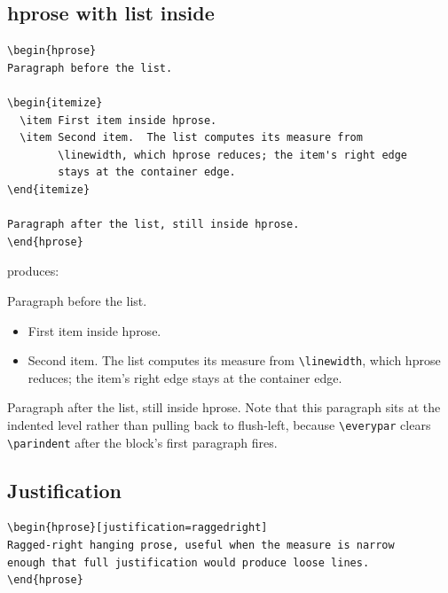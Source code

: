 \documentclass[11pt, twoside, openany]{article}
\newcommand{\cs}[1]{\texttt{\textbackslash #1}}
\begin{document}
\subsection*{hprose with list inside}

\begin{verbatim}
\begin{hprose}
Paragraph before the list.

\begin{itemize}
  \item First item inside hprose.
  \item Second item.  The list computes its measure from
        \linewidth, which hprose reduces; the item's right edge
        stays at the container edge.
\end{itemize}

Paragraph after the list, still inside hprose.
\end{hprose}
\end{verbatim}

\noindent produces:

\begin{hprose}
Paragraph before the list. \lipsum[10][1-3]

\begin{itemize}
  \item First item inside hprose.
  \item Second item.  The list computes its measure from
        \cs{linewidth}, which hprose reduces; the item's right edge
        stays at the container edge.
\end{itemize}

Paragraph after the list, still inside hprose. Note that this
paragraph sits at the indented level rather than pulling back to
flush-left, because \cs{everypar} clears \cs{parindent} after the
block's first paragraph fires. \lipsum[11][1-3]
\end{hprose}

\subsection*{Justification}

\begin{verbatim}
\begin{hprose}[justification=raggedright]
Ragged-right hanging prose, useful when the measure is narrow
enough that full justification would produce loose lines.
\end{hprose}
\end{verbatim}
\end{document}

